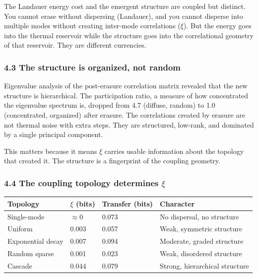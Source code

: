 \documentclass[
  11pt,
  a4paper]{article}
\begin{document}
The Landauer energy cost and the emergent structure are coupled but
distinct. You cannot erase without dispersing (Landauer), and you cannot
disperse into multiple modes without creating inter-mode correlations
(\(\xi\)). But the energy goes into the thermal reservoir while the
structure goes into the correlational geometry of that reservoir. They
are different currencies.

\subsubsection{4.3 The structure is organized, not
random}\label{the-structure-is-organized-not-random}

Eigenvalue analysis of the post-erasure correlation matrix revealed that
the new structure is hierarchical. The participation ratio, a measure of
how concentrated the eigenvalue spectrum is, dropped from 4.7 (diffuse,
random) to 1.0 (concentrated, organized) after erasure. The correlations
created by erasure are not thermal noise with extra steps. They are
structured, low-rank, and dominated by a single principal component.

This matters because it means \(\xi\) carries usable information about
the topology that created it. The structure is a fingerprint of the
coupling geometry.

\subsubsection{\texorpdfstring{4.4 The coupling topology determines
\(\xi\)}{4.4 The coupling topology determines \textbackslash xi}}\label{the-coupling-topology-determines-xi}

\begin{longtable}[]{@{}llll@{}}
\toprule\noalign{}
Topology & \(\xi\) (bits) & Transfer (bits) & Character \\
\midrule\noalign{}
\endhead
\bottomrule\noalign{}
\endlastfoot
Single-mode & \(\approx 0\) & 0.073 & No dispersal, no structure \\
Uniform & 0.003 & 0.057 & Weak, symmetric structure \\
Exponential decay & 0.007 & 0.094 & Moderate, graded structure \\
Random sparse & 0.001 & 0.023 & Weak, disordered structure \\
Cascade & 0.044 & 0.079 & Strong, hierarchical structure \\
\end{longtable}
\end{document}
